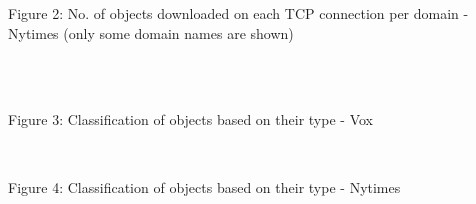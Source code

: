 \documentclass[12pt]{article}
\begin{document}
\vspace*{-0.6cm}
\begin{center}Figure 2: No. of objects downloaded on each TCP connection per domain - Nytimes (only some domain names are shown)\end{center}
~\\\\
{
\begin{center}Figure 3: Classification of objects based on their type - Vox\end{center}
}
~
{
\vspace*{-0.6cm}
\begin{center}Figure 4: Classification of objects based on their type - Nytimes\end{center}
}
\end{document}
